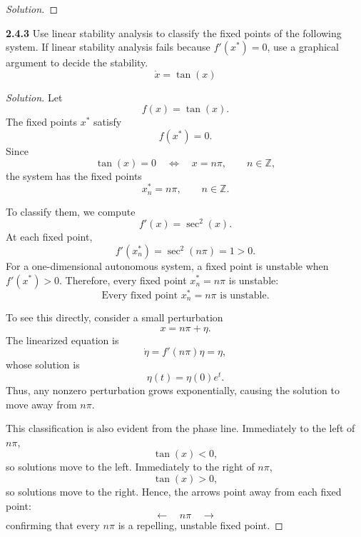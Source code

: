 \documentclass[10pt]{amsart}
\newenvironment{solution}
{\begin{proof}[Solution]}
{\end{proof}}
\begin{document}
\begin{onehalfspace}
\begin{solution}
        \end{solution}

        \noindent\textbf{2.4.3} Use linear stability analysis to classify the fixed points
        of the following system.
        If linear stability analysis fails because $f'(x^*)=0$, use a graphical argument to decide
        the stability.
        \[
            \dot{x} = \tan(x)
        \]

        \begin{solution}
            Let
            \[
                f(x)=\tan(x).
            \]
            The fixed points \(x^*\) satisfy
            \[
                f(x^*)=0.
            \]
            Since
            \[
                \tan(x)=0
                \quad\Longleftrightarrow\quad
                x=n\pi,
                \qquad n\in\mathbb{Z},
            \]
            the system has the fixed points
            \[
                \boxed{x_n^*=n\pi,\qquad n\in\mathbb{Z}.}
            \]

            To classify them, we compute
            \[
                f'(x)=\sec^2(x).
            \]
            At each fixed point,
            \[
                f'(x_n^*)
                =\sec^2(n\pi)
                =1>0.
            \]
            For a one-dimensional autonomous system, a fixed point is unstable when
            \(f'(x^*)>0\). Therefore, every fixed point \(x_n^*=n\pi\) is unstable:
            \[
                \boxed{\text{Every fixed point }x_n^*=n\pi\text{ is unstable.}}
            \]

            To see this directly, consider a small perturbation
            \[
                x=n\pi+\eta.
            \]
            The linearized equation is
            \[
                \dot{\eta}=f'(n\pi)\eta=\eta,
            \]
            whose solution is
            \[
                \eta(t)=\eta(0)e^t.
            \]
            Thus, any nonzero perturbation grows exponentially, causing the solution
            to move away from \(n\pi\).

            This classification is also evident from the phase line. Immediately to
            the left of \(n\pi\),
            \[
                \tan(x)<0,
            \]
            so solutions move to the left. Immediately to the right of \(n\pi\),
            \[
                \tan(x)>0,
            \]
            so solutions move to the right. Hence, the arrows point away from each
            fixed point:
            \[
                \longleftarrow\quad n\pi\quad\longrightarrow
            \]
            confirming that every \(n\pi\) is a repelling, unstable fixed point.


\end{solution}
\end{onehalfspace}
\end{document}
